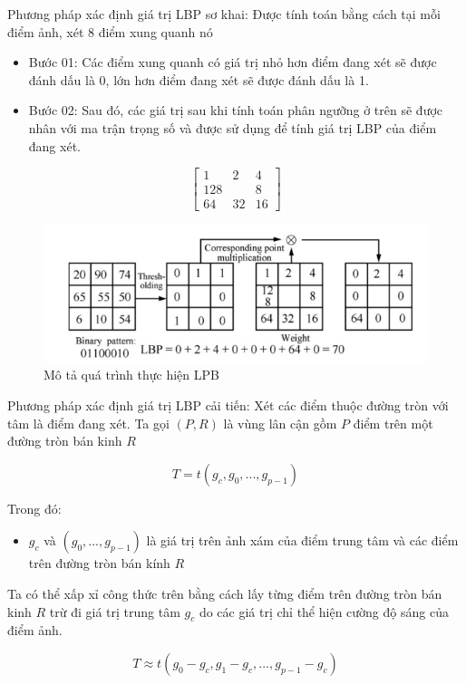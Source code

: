 \documentclass{article}
\begin{document}
	\qquad Phương pháp xác định giá trị LBP sơ khai: Được tính toán bằng cách tại mỗi điểm ảnh, xét 8 điểm xung quanh nó
	\begin{itemize}
		\item Bước 01: Các điểm xung quanh có giá trị nhỏ hơn điểm đang xét sẽ được đánh dấu là 0, lớn hơn điểm đang xét sẽ được đánh dấu là 1.
		\item Bước 02: Sau đó, các giá trị sau khi tính toán phân ngưỡng ở trên sẽ được nhân với ma trận trọng số và được sử dụng để tính giá trị LBP của điểm đang xét.
	\end{itemize}

	$$\begin{bmatrix}1 & 2 & 4 \\128 & & 8\\64 & 32 & 16\end{bmatrix}$$
	
	\begin{figure}[H]
		\centering
		\includegraphics[width=0.75\linewidth]{images/orginal_lbp.png}
		\caption{Mô tả quá trình thực hiện LPB}
		\label{fig:writing-thesis}
	\end{figure}
	Phương pháp xác định giá trị LBP cải tiến: Xét các điểm thuộc đường tròn với tâm là điểm đang xét. Ta gọi $(P,R)$ là vùng lân cận gồm $P$ điểm trên một đường tròn bán kinh $R$
	
	\begin{equation}
		T = t(g_c, g_0, ..., g_{p-1})
	\end{equation}

	Trong đó:
	\begin{itemize}
		\item $g_c$ và $(g_0, ..., g_{p-1})$ là giá trị trên ảnh xám của điểm trung tâm và các điểm trên đường tròn bán kính $R$
	\end{itemize}

	Ta có thể xấp xỉ công thức trên bằng cách lấy từng điểm trên đường tròn bán kinh $R$ trừ đi giá trị trung tâm $g_c$ do các giá trị chỉ thể hiện cường độ sáng của điểm ảnh.
	
	\begin{equation}
		T \approx t(g_0 - g_c, g_1 - g_c, ..., g_{p-1} - g_c)
	\end{equation}
\end{document}
